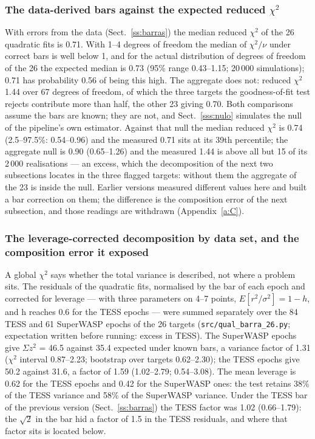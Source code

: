 \documentclass{aa}
\begin{document}
\subsubsection{The data-derived bars against the expected reduced \texorpdfstring{$\chi^2$}{chi2}}\label{sss:esperado}
With errors from the data (Sect.~\ref{ss:barras}) the median reduced $\chi^2$ of the 26 quadratic fits is 0.71. With 1--4 degrees of freedom the median of $\chi^2/\nu$ under correct bars is well below 1, and for the actual distribution of degrees of freedom of the 26 the expected median is 0.73 (95\% range 0.43--1.15; 20\,000 simulations); 0.71 has probability 0.56 of being this high. The aggregate does not: reduced $\chi^2$ 1.44 over 67 degrees of freedom, of which the three targets the goodness-of-fit test rejects contribute more than half, the other 23 giving 0.70. Both comparisons assume the bars are known; they are not, and Sect.~\ref{sss:nulo} simulates the null of the pipeline's own estimator. Against that null the median reduced $\chi^2$ is 0.74 (2.5--97.5\%: 0.54--0.96) and the measured 0.71 sits at its 39th percentile; the aggregate null is 0.90 (0.65--1.26) and the measured 1.44 is above all but 15 of its 2\,000 realisations --- an excess, which the decomposition of the next two subsections locates in the three flagged targets: without them the aggregate of the 23 is inside the null. Earlier versions measured different values here and built a bar correction on them; the difference is the composition error of the next subsection, and those readings are withdrawn (Appendix~\ref{a:C}).


\subsubsection{The leverage-corrected decomposition by data set, and the composition error it exposed}\label{sss:decomp}
A global $\chi^2$ says whether the total variance is described, not where a problem sits. The residuals of the quadratic fits, normalised by the bar of each epoch and corrected for leverage --- with three parameters on 4--7 points, $E[r^2/\sigma^2]=1-h$, and h reaches 0.6 for the TESS epochs --- were summed separately over the 84 TESS and 61 SuperWASP epochs of the 26 targets (\texttt{src/\allowbreak qual\_\allowbreak barra\_\allowbreak 26.py}; expectation written before running: excess in TESS). The SuperWASP epochs give $\Sigma z^2$ = 46.5 against 35.4 expected under known bars, a variance factor of 1.31 ($\chi^2$ interval 0.87--2.23; bootstrap over targets 0.62--2.30); the TESS epochs give 50.2 against 31.6, a factor of 1.59 (1.02--2.79; 0.54--3.08). The mean leverage is 0.62 for the TESS epochs and 0.42 for the SuperWASP ones: the test retains 38\% of the TESS variance and 58\% of the SuperWASP variance. Under the TESS bar of the previous version (Sect.~\ref{ss:barras}) the TESS factor was 1.02 (0.66--1.79): the $\sqrt{2}$ in the bar hid a factor of 1.5 in the TESS residuals, and where that factor sits is located below.
\end{document}
